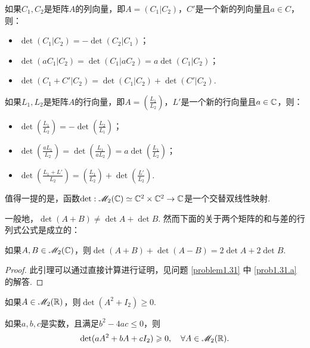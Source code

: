   \begin{prop}
    如果$C_1,C_2$是矩阵$A$的列向量，即$A=(C_1|C_2)$，$C'$是一个新的列向量且$a\in C$，则：
    \begin{itemize}
      \item $\det (C_1|C_2)=-\det(C_2|C_1)$；
      \item $\det(aC_1|C_2)=\det(C_1|aC_2)=a\det(C_1|C_2)$；
      \item $\det (C_1+C'|C_2)=\det(C_1|C_2)+
      \det(C'|C_2)$.
    \end{itemize}

    如果$L_1,L_2$是矩阵$A$的行向量，即$A=\left(\frac{L_1}{L_2}\right)$，$L'$是一个新的行向量且$a\in \mathbb C$，则：
    \begin{itemize}
      \item $\det\left(\frac{L_1}{L_2}\right)=-
      \det\left(\frac{L_2}{L_1}\right)$；
      \item $\det \left(\frac{aL_1}{L_2}\right)=
      \det \left(\frac{L_1}{aL_2}\right)=
      a\det \left(\frac{L_1}{L_2}\right)$；
      \item $\det \left(\frac{L_1+L'}{L_2}\right)
      =\left(\frac{L_1}{L_2}\right)+\det
      \left(\frac{L'}{L_2}\right)$.
    \end{itemize}
  \end{prop}
  \begin{remark}
    值得一提的是，函数$\det:\mathscr M_2(\mathbb C)\simeq\mathbb C^2\times\mathbb C^2\to\mathbb C$是一个{\kaishu 交替双线性映射}.
  \end{remark}

  一般地，$\det(A+B)\ne\det A+\det B$. 然而下面的关于两个矩阵的和与差的行列式公式是成立的：
  \begin{mybox}
    \begin{lemma}[一个特殊的行列式]

      如果$A,B\in\mathscr M_2(\mathbb C)$，则$\det(A+B)+\det(A-B)=2\det A+2\det B$.
    \end{lemma}
  \end{mybox}
  \begin{proof}
    此引理可以通过直接计算进行证明，见问题 \ref{problem1.31} 中 \ref{prob1.31.a} 的解答.
  \end{proof}

  \begin{mybox}
    \begin{lemma}[著名的行列式不等式]
    \begin{enum}
      \item 如果$A\in\mathscr M_2(\mathbb R)$，则$\det(A^2+I_2)\ge0$.
      \item 如果$a,b,c$是实数，且满足$b^2-4ac\le0$，则
      \[
        \det (aA^2+bA+cI_2) \geqslant0,\quad \forall A\in\mathscr M_2(\mathbb R).
      \]
    \end{enum}
    \end{lemma}
  \end{mybox}

